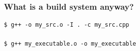 \documentclass[aspectratio=169]{beamer}
\newif\iftransitions
\newcommand{\cpause}{\iftransitions \pause \fi}
\begin{document}
%

\begin{frame}[fragile]
  \frametitle{What is a build system anyway?}

  \cpause
  \begin{lstlisting}
$ g++ -o my_src.o -I . -c my_src.cpp

$ g++ my_executable.o -o my_executable
  \end{lstlisting}

\end{frame}
\end{document}
